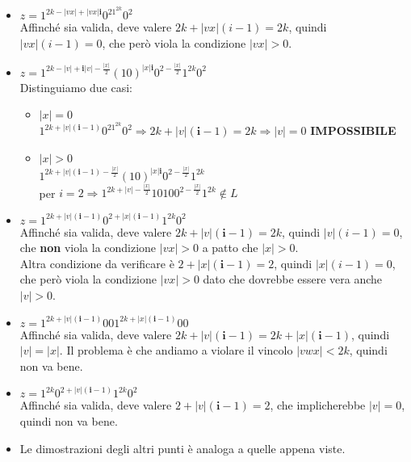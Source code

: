 \documentclass[a4paper,oneside]{scrbook}
\newcommand{\greenmark}{\quad \textcolor{green}{\checkmark}}
\begin{document}
\begin{itemize}
	\item $z=1^{2k-|vx|+|vx|\textbf{i}}0^21^{2k}0^2$\\
	Affinché sia valida, deve valere $2k+|vx|(i-1)=2k$, quindi $|vx|(i-1)=0$, che però viola la condizione $|vx|>0$. \greenmark
	
	\item $z=1^{2k-|v|+\textbf{i}|v|-\frac{|x|}{2}}(10)^{|x|\textbf{i}}0^{2-\frac{|x|}{2}}1^{2k}0^2$\\
	Distinguiamo due casi:
	\begin{itemize}
		\item $|x|=0$\\
		$1^{2k+|v|(\textbf{i}-1)}0^21^{2k}0^2 \Rightarrow 2k+|v|(\textbf{i}-1)=2k \Rightarrow |v|=0$ \textbf{IMPOSSIBILE} \greenmark
		\item $|x|>0$\\
		$1^{2k+|v|(\textbf{i}-1)-\frac{|x|}{2}}(10)^{|x|\textbf{i}}0^{2-\frac{|x|}{2}}1^{2k}$\\
		per $i=2 \Rightarrow 1^{2k+|v|-\frac{|x|}{2}}10100^{2-\frac{|x|}{2}}1^{2k} \notin L$ \greenmark
	\end{itemize}

	\item $z=1^{2k+|v|(\textbf{i}-1)}0^{2+|x|(\textbf{i}-1)}1^{2k}0^2$\\
	Affinché sia valida, deve valere $2k+|v|(\textbf{i}-1)=2k$, quindi $|v|(i-1)=0$, che \textbf{non} viola la condizione $|vx|>0$ a patto che $|x|>0$.\\
	Altra condizione da verificare è $2+|x|(\textbf{i}-1)=2$, quindi $|x|(i-1)=0$, che però viola la condizione $|vx|>0$ dato che dovrebbe essere vera anche $|v|>0$. \greenmark

	\item $z=1^{2k+|v|(\textbf{i}-1)}001^{2k+|x|(\textbf{i}-1)}00$\\
	Affinché sia valida, deve valere $2k+|v|(\textbf{i}-1)=2k+|x|(\textbf{i}-1)$, quindi $|v|=|x|$. Il problema è che andiamo a violare il vincolo $|vwx|<2k$, quindi non va bene. \greenmark
	
	\item $z=1^{2k}0^{2+|v|(\textbf{i}-1)}1^{2k}0^2$\\
	Affinché sia valida, deve valere $2+|v|(\textbf{i}-1)=2$, che implicherebbe $|v|=0$, quindi non va bene. \greenmark

	\item Le dimostrazioni degli altri punti è analoga a quelle appena viste.
\end{itemize}
\end{document}
